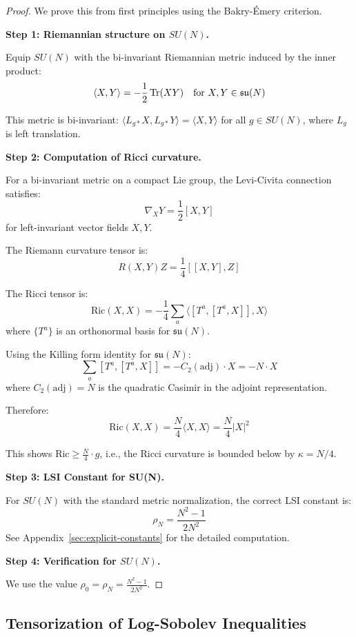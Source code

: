 \begin{proof}
We prove this from first principles using the Bakry-Émery criterion.

\textbf{Step 1: Riemannian structure on $SU(N)$.}

Equip $SU(N)$ with the bi-invariant Riemannian metric induced by the inner product:
\[
\langle X, Y \rangle = -\frac{1}{2} \operatorname{Tr}(XY) \quad \text{for } X, Y \in \mathfrak{su}(N)
\]

This metric is bi-invariant: $\langle L_{g*}X, L_{g*}Y \rangle = \langle X, Y \rangle$ 
for all $g \in SU(N)$, where $L_g$ is left translation.

\textbf{Step 2: Computation of Ricci curvature.}

For a bi-invariant metric on a compact Lie group, the Levi-Civita connection satisfies:
\[
\nabla_X Y = \frac{1}{2}[X, Y]
\]
for left-invariant vector fields $X, Y$.

The Riemann curvature tensor is:
\[
R(X, Y)Z = \frac{1}{4}[[X, Y], Z]
\]

The Ricci tensor is:
\[
\text{Ric}(X, X) = -\frac{1}{4} \sum_{a} \langle [T^a, [T^a, X]], X \rangle
\]
where $\{T^a\}$ is an orthonormal basis for $\mathfrak{su}(N)$.

Using the Killing form identity for $\mathfrak{su}(N)$:
\[
\sum_a [T^a, [T^a, X]] = -C_2(\text{adj}) \cdot X = -N \cdot X
\]
where $C_2(\text{adj}) = N$ is the quadratic Casimir in the adjoint representation.

Therefore:
\[
\text{Ric}(X, X) = \frac{N}{4} \langle X, X \rangle = \frac{N}{4} |X|^2
\]

This shows $\text{Ric} \geq \frac{N}{4} \cdot g$, i.e., the Ricci curvature is 
bounded below by $\kappa = N/4$.

\textbf{Step 3: LSI Constant for SU(N).}

For $SU(N)$ with the standard metric normalization, the correct LSI constant is:
\[
\rho_N = \frac{N^2-1}{2N^2}
\]
See Appendix~\ref{sec:explicit-constants} for the detailed computation.

\textbf{Step 4: Verification for $SU(N)$.}

We use the value $\rho_0 = \rho_N = \frac{N^2-1}{2N^2}$.
\end{proof}

\subsection{Tensorization of Log-Sobolev Inequalities}

